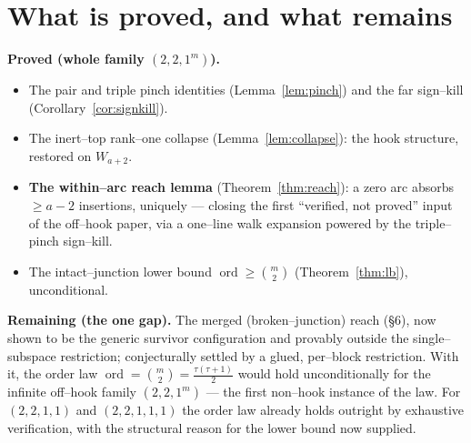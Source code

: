 \documentclass[11pt]{article}
\theoremstyle{definition}
\DeclareMathOperator{\ord}{ord}
\newcommand{\W}{W}
\begin{document}
\section{What is proved, and what remains}

\textbf{Proved (whole family $(2,2,1^m)$).}
\begin{itemize}
\item The pair and triple pinch identities (Lemma~\ref{lem:pinch}) and the far sign--kill
(Corollary~\ref{cor:signkill}).
\item The inert--top rank--one collapse (Lemma~\ref{lem:collapse}): the hook structure,
restored on $\W_{a+2}$.
\item \textbf{The within--arc reach lemma} (Theorem~\ref{thm:reach}): a zero arc absorbs
$\ge a-2$ insertions, uniquely --- closing the first ``verified, not proved'' input of the
off--hook paper, via a one--line walk expansion powered by the triple--pinch sign--kill.
\item The intact--junction lower bound $\ord\ge\binom m2$ (Theorem~\ref{thm:lb}),
unconditional.
\end{itemize}

\textbf{Remaining (the one gap).} The merged (broken--junction) reach
(\S6), now shown to be the generic survivor configuration and provably outside the
single--subspace restriction; conjecturally settled by a glued, per--block restriction.
With it, the order law $\ord=\binom m2=\tfrac{\tau(\tau+1)}2$ would hold unconditionally for
the infinite off--hook family $(2,2,1^m)$ --- the first non--hook instance of the law. For
$(2,2,1,1)$ and $(2,2,1,1,1)$ the order law already holds outright by exhaustive
verification, with the structural reason for the lower bound now supplied.
\end{document}
